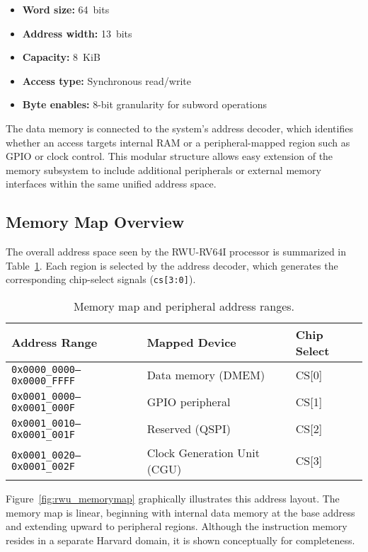 \begin{itemize}
  \item \textbf{Word size:} 64~bits  
  \item \textbf{Address width:} 13~bits  
  \item \textbf{Capacity:} 8~KiB  
  \item \textbf{Access type:} Synchronous read/write  
  \item \textbf{Byte enables:} 8-bit granularity for subword operations
\end{itemize}

The data memory is connected to the system’s address decoder, which identifies whether an access targets internal RAM or a peripheral-mapped region such as GPIO or clock control.  
This modular structure allows easy extension of the memory subsystem to include additional peripherals or external memory interfaces within the same unified address space.


\subsection{Memory Map Overview}
The overall address space seen by the RWU-RV64I processor is summarized in Table~\ref{tab:memmap}.
Each region is selected by the address decoder, which generates the corresponding chip-select signals (\texttt{cs[3:0]}).

\begin{table}[H]
\centering
\caption{Memory map and peripheral address ranges.}
\label{tab:memmap}
\begin{tabular}{lll}
\toprule
\textbf{Address Range} & \textbf{Mapped Device} & \textbf{Chip Select}\\
\midrule
\texttt{0x0000\_0000–0x0000\_FFFF} & Data memory (DMEM) & CS[0]\\
\texttt{0x0001\_0000–0x0001\_000F} & GPIO peripheral & CS[1]\\
\texttt{0x0001\_0010–0x0001\_001F} & Reserved (QSPI) & CS[2]\\
\texttt{0x0001\_0020–0x0001\_002F} & Clock Generation Unit (CGU) & CS[3]\\
\bottomrule
\end{tabular}
\end{table}

Figure~\ref{fig:rwu_memorymap} graphically illustrates this address layout.  
The memory map is linear, beginning with internal data memory at the base address and extending upward to peripheral regions.  
Although the instruction memory resides in a separate Harvard domain, it is shown conceptually for completeness.

